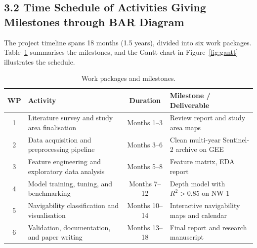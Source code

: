 \documentclass[12pt,a4paper]{article}
\begin{document}
\newpage
\subsection*{3.2 Time Schedule of Activities Giving Milestones through BAR Diagram}

The project timeline spans 18 months (1.5 years), divided into six work packages. Table~\ref{tab:milestones} summarises the milestones, and the Gantt chart in Figure~\ref{fig:gantt} illustrates the schedule.

\begin{table}[H]
\centering
\caption{Work packages and milestones.}
\label{tab:milestones}
\begin{tabular}{c p{5.5cm} c p{4.5cm}}
\toprule
\textbf{WP} & \textbf{Activity} & \textbf{Duration} & \textbf{Milestone / Deliverable} \\
\midrule
1 & Literature survey and study area finalisation & Months 1--3 & Review report and study area maps \\
2 & Data acquisition and preprocessing pipeline & Months 3--6 & Clean multi-year Sentinel-2 archive on GEE \\
3 & Feature engineering and exploratory data analysis & Months 5--8 & Feature matrix, EDA report \\
4 & Model training, tuning, and benchmarking & Months 7--12 & Depth model with $R^{2} > 0.85$ on NW-1 \\
5 & Navigability classification and visualisation & Months 10--14 & Interactive navigability maps and calendar \\
6 & Validation, documentation, and paper writing & Months 13--18 & Final report and research manuscript \\
\bottomrule
\end{tabular}
\end{table}
\end{document}
